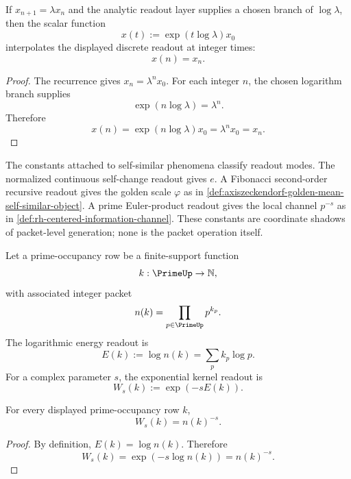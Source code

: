 \begin{proposition}
\label{prop:analytic-interpolation-scale-readout}
If $x_{n+1}=\lambda x_n$ and the analytic readout layer supplies a chosen
branch of $\log\lambda$, then the scalar function
$$
x(t):=\exp(t\log\lambda)x_0
$$
interpolates the displayed discrete readout at integer times:
$$
x(n)=x_n.
$$
\end{proposition}

\begin{proof}
The recurrence gives $x_n=\lambda^n x_0$. For each integer $n$, the chosen
logarithm branch supplies
$$
\exp(n\log\lambda)=\lambda^n.
$$
Therefore
$$
x(n)=\exp(n\log\lambda)x_0=\lambda^n x_0=x_n.
$$
\end{proof}

\begin{principle}
\label{prin:constants-classify-readout-modes}
The constants attached to self-similar phenomena classify readout modes.
The normalized continuous self-change readout gives $e$. A Fibonacci
second-order recursive readout gives the golden scale $\varphi$ as in
\autoref{def:axiszeckendorf-golden-mean-self-similar-object}. A prime
Euler-product readout gives the local channel $p^{-s}$ as in
\autoref{def:rh-centered-information-channel}. These constants are
coordinate shadows of packet-level generation; none is the packet
operation itself.
\end{principle}

\begin{definition}
\label{def:prime-exponential-kernel-readout}
Let a prime-occupancy row be a finite-support function
$$
k:\PrimeUp\to\mathbb N,
$$
with associated integer packet
$$
n(k)=\prod_{p\in\PrimeUp}p^{k_p}.
$$
The logarithmic energy readout is
$$
E(k):=\log n(k)=\sum_p k_p\log p.
$$
For a complex parameter $s$, the exponential kernel readout is
$$
W_s(k):=\exp(-sE(k)).
$$
\end{definition}

\begin{proposition}
\label{prop:exponential-kernel-dirichlet-weight}
For every displayed prime-occupancy row $k$,
$$
W_s(k)=n(k)^{-s}.
$$
\end{proposition}

\begin{proof}
By definition, $E(k)=\log n(k)$. Therefore
$$
W_s(k)=\exp(-s\log n(k))=n(k)^{-s}.
$$
\end{proof}

